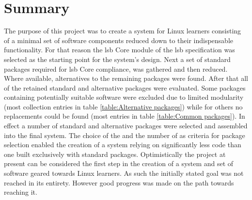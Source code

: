\section{Summary}\label{Summary}

The purpose of this project was to create a system for Linux learners consisting of a minimal set of software components reduced down to their indispensable functionality. For that reason the \gls{lsb} Core module of the \gls{lsb} specification was selected as the starting point for the system's design. Next a set of standard packages required for \gls{lsb} Core compliance, was gathered and then reduced. Where available, alternatives to the remaining packages were found. After that all of the retained standard and alternative packages were evaluated. Some packages containing potentially suitable software were excluded due to limited modularity (most collection entries in table \ref{table:Alternative packages}) while for others no replacements could be found (most entries in table \ref{table:Common packages}). In effect a number of standard and alternative packages were selected and assembled into the final system. The choice of the  and the number of  as criteria for package selection enabled the creation of a system relying on significantly less code than one built exclusively with standard packages. Optimistically the project at present can be considered the first step in the creation of a system and set of software geared towards Linux learners. As such the initially stated goal was not reached in its entirety. However good progress was made on the path towards reaching it.
